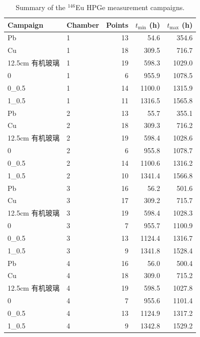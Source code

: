 \begin{table}[htbp]
  \centering
  \caption{Summary of the $^{146}$Eu HPGe measurement campaigns.}
  \label{tab:eu146-campaigns}
  \begin{tabular}{llrrr}
    \hline
    Campaign & Chamber & Points & $t_{\min}$ (h) & $t_{\max}$ (h) \\
    \hline
    Pb & 1 & 13 & 54.6 & 354.6 \\
    Cu & 1 & 18 & 309.5 & 716.7 \\
    12.5cm 有机玻璃 & 1 & 19 & 598.3 & 1029.0 \\
    0 & 1 & 6 & 955.9 & 1078.5 \\
    0_0.5 & 1 & 14 & 1100.0 & 1315.9 \\
    1_0.5 & 1 & 11 & 1316.5 & 1565.8 \\
    Pb & 2 & 13 & 55.7 & 355.1 \\
    Cu & 2 & 18 & 309.3 & 716.2 \\
    12.5cm 有机玻璃 & 2 & 19 & 598.4 & 1028.6 \\
    0 & 2 & 6 & 955.8 & 1078.7 \\
    0_0.5 & 2 & 14 & 1100.6 & 1316.2 \\
    1_0.5 & 2 & 10 & 1341.4 & 1566.8 \\
    Pb & 3 & 16 & 56.2 & 501.6 \\
    Cu & 3 & 17 & 309.2 & 715.7 \\
    12.5cm 有机玻璃 & 3 & 19 & 598.4 & 1028.3 \\
    0 & 3 & 7 & 955.7 & 1100.9 \\
    0_0.5 & 3 & 13 & 1124.4 & 1316.7 \\
    1_0.5 & 3 & 9 & 1341.8 & 1528.4 \\
    Pb & 4 & 16 & 56.0 & 500.4 \\
    Cu & 4 & 18 & 309.0 & 715.2 \\
    12.5cm 有机玻璃 & 4 & 19 & 598.5 & 1027.8 \\
    0 & 4 & 7 & 955.6 & 1101.4 \\
    0_0.5 & 4 & 13 & 1124.9 & 1317.2 \\
    1_0.5 & 4 & 9 & 1342.8 & 1529.2 \\
    \hline
  \end{tabular}
\end{table}
